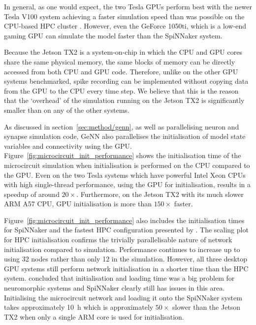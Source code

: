 \documentclass[utf8]{frontiersSCNS} %
\begin{document}
In general, as one would expect, the two Tesla GPUs perform best with the newer Tesla V100 system achieving a faster simulation speed than was possible on the CPU-based HPC cluster \citep{VanAlbada2018}.
However, even the GeForce 1050ti, which is a low-end gaming GPU can simulate the model faster than the SpiNNaker system.

Because the Jetson TX2 is a system-on-chip in which the CPU and GPU cores share the same physical memory, the same blocks of memory can be directly accessed from both CPU and GPU code.
Therefore, unlike on the other GPU systems benchmarked, spike recording can be implemented without copying data from the GPU to the CPU every time step.
We believe that this is the reason that the `overhead' of the simulation running on the Jetson TX2 is significantly smaller than on any of the other systems.

As discussed in section~\ref{sec:method/genn}, as well as parallelising neuron and synapse simulation code, GeNN also parallelises the initialisation of model state variables and connectivity using the GPU.
Figure~\ref{fig:microcircuit_init_performance} shows the initialisation time of the microcircuit simulation when initialisation is performed on the CPU compared to the GPU.
Even on the two Tesla systems which have powerful Intel Xeon CPUs with high single-thread performance, using the GPU for initialisation, results in a speedup of around $20\times$.
Furthermore, on the Jetson TX2 with its much slower ARM A57 CPU, GPU initialisation is more than $150\times$ faster.

Figure~\ref{fig:microcircuit_init_performance} also includes the initialisation times for SpiNNaker and the fastest HPC configuration presented by \citeauthor{VanAlbada2018}.
The scaling plot for HPC initialisation confirms the trivially parallelisable nature of network initialisation compared to simulation.
Performance continues to increase up to using 32 nodes rather than only 12 in the simulation.
However, all three desktop GPU systems still perform network initialisation in a shorter time than the HPC system.
\citet{Diamond2018} concluded that initialisation and loading time was a big problem for neuromorphic systems and SpiNNaker clearly still has issues in this area.
Initialising the microcircuit network and loading it onto the SpiNNaker system takes approximately \SI{10}{\hour} which is approximately $50\times$ slower than the Jetson TX2 when only a single ARM core is used for initialisation.
\end{document}
